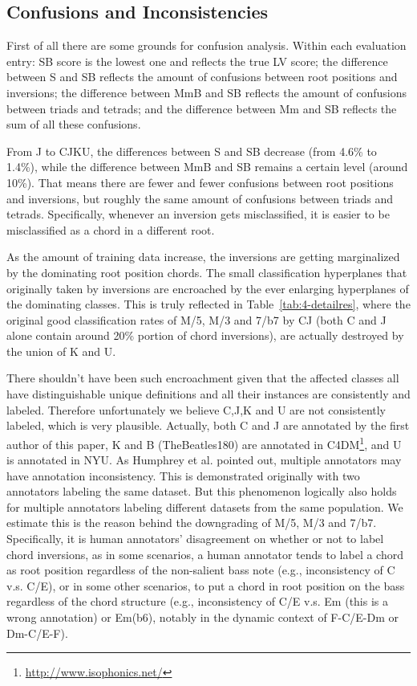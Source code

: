 \subsection{Confusions and Inconsistencies}
First of all there are some grounds for confusion analysis. Within each evaluation entry: SB score is the lowest one and reflects the true LV score; the difference between S and SB reflects the amount of confusions between root positions and inversions; the difference between MmB and SB reflects the amount of confusions between triads and tetrads; and the difference between Mm and SB reflects the sum of all these confusions.

From J to CJKU, the differences between S and SB decrease (from 4.6\% to 1.4\%), while the difference between MmB and SB remains a certain level (around 10\%). That means there are fewer and fewer confusions between root positions and inversions, but roughly the same amount of confusions between triads and tetrads. Specifically, whenever an inversion gets misclassified, it is easier to be misclassified as a chord in a different root.

As the amount of training data increase, the inversions are getting marginalized by the dominating root position chords. The small classification hyperplanes that originally taken by inversions are encroached by the ever enlarging hyperplanes of the dominating classes. This is truly reflected in Table~\ref{tab:4-detailres}, where the original good classification rates of M/5, M/3 and 7/b7 by CJ (both C and J alone contain around 20\% portion of chord inversions), are actually destroyed by the union of K and U.

There shouldn't have been such encroachment given that the affected classes all have distinguishable unique definitions and all their instances are consistently and labeled. Therefore unfortunately we believe C,J,K and U are not consistently labeled, which is very plausible. Actually, both C and J are annotated by the first author of this paper, K and B (TheBeatles180) are annotated in C4DM\footnote{\url{http://www.isophonics.net/}}, and U is annotated in NYU. As Humphrey et al. \cite{humphreyfour} pointed out, multiple annotators may have annotation inconsistency. This is demonstrated originally with two annotators labeling the same dataset. But this phenomenon logically also holds for multiple annotators labeling different datasets from the same population. We estimate this is the reason behind the downgrading of M/5, M/3 and 7/b7. Specifically, it is human annotators' disagreement on whether or not to label chord inversions, as in some scenarios, a human annotator tends to label a chord as root position regardless of the non-salient bass note (e.g., inconsistency of C v.s. C/E), or in some other scenarios, to put a chord in root position on the bass regardless of the chord structure (e.g., inconsistency of C/E v.s. Em (this is a wrong annotation) or Em(b6), notably in the dynamic context of F-C/E-Dm or Dm-C/E-F).

